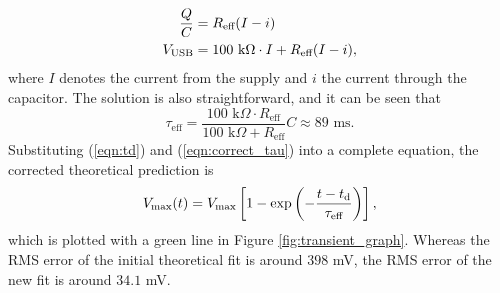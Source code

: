 \documentclass{article}
\begin{document}
\begin{equation*}
    \begin{split}
        \frac{Q}{C} &= R_\text{eff}(I -i)\\
        V_{\text{USB}} &= 100\text{ k}\Omega\cdot I + R_\text{eff} (I - i),
    \end{split}
\end{equation*}
where $I$ denotes the current from the supply and $i$ the current through the capacitor. The solution is also straightforward, and it can be seen that
\begin{equation}
    \tau_\text{eff} = \frac{100 \text{ k}\Omega \cdot R_\text{eff}}{100 \text{ k}\Omega + R_\text{eff}} C \approx 89\text{ ms}.
    \label{eqn:correct_tau}
\end{equation}
Substituting (\ref{eqn:td}) and (\ref{eqn:correct_tau}) into a complete equation, the corrected theoretical prediction is
\begin{equation*}
    V_{\text{max}}(t) = V_{\text{max}} \left[1 - \exp \left(-\frac{t-t_\text{d}}{\tau_\text{eff}}\right) \right],
\end{equation*}
which is plotted with a green line in Figure \ref{fig:transient_graph}. Whereas the RMS error of the initial theoretical fit is around $398$ mV, the RMS error of the new fit is around $34.1$ mV.
\end{document}
